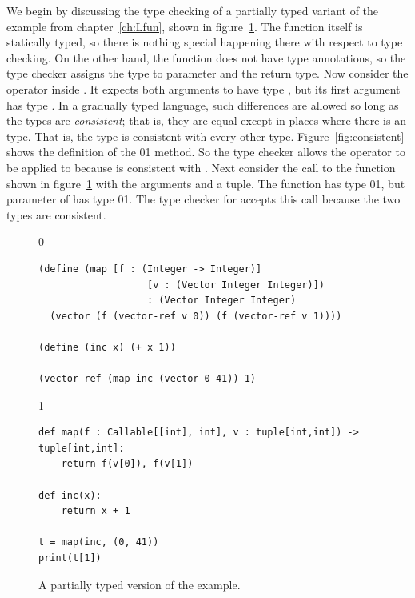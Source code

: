 \documentclass[7x10]{TimesAPriori_MIT}%
\def\racketEd{0}
\def\pythonEd{1}
\def\edition{1}
\newcommand{\racket}[1]{{\if\edition\racketEd{#1}\fi}}
\newcommand{\pythonColor}[0]{}
\newcommand{\python}[1]{{\if\edition\pythonEd\pythonColor #1\fi}}
\numberwithin{theorem}{chapter}
\numberwithin{definition}{chapter}
\numberwithin{equation}{chapter}
\begin{document}
We begin by discussing the type checking of a partially typed variant
of the  example from chapter~\ref{ch:Lfun}, shown in
figure~\ref{fig:gradual-map}.  The  function itself is
statically typed, so there is nothing special happening there with
respect to type checking. On the other hand, the  function
does not have type annotations, so the type checker assigns the type
\CANYTY{} to parameter  and the return type.  Now consider the
\code{+} operator inside . It expects both arguments to have
type \INTTY{}, but its first argument  has type \CANYTY{}.  In
a gradually typed language, such differences are allowed so long as
the types are \emph{consistent}; that is, they are equal except in
places where there is an \CANYTY{} type. That is, the type \CANYTY{}
is consistent with every other type.  Figure~\ref{fig:consistent}
shows the definition of the
\racket{}\python{} method.
%
So the type checker allows the \code{+} operator to be applied
to  because \CANYTY{} is consistent with \INTTY{}.
%
Next consider the call to the  function shown in
figure~\ref{fig:gradual-map} with the arguments  and a
tuple. The  function has type
\racket{}\python{},
but parameter  of  has type
\racket{}\python{}.
The type checker for \LangGrad{} accepts this call because the two types are
consistent.

\begin{figure}[btp]
  \begin{tcolorbox}[colback=white]
{\if\edition\racketEd
    \begin{lstlisting}
(define (map [f : (Integer -> Integer)]
                   [v : (Vector Integer Integer)])
                   : (Vector Integer Integer)
  (vector (f (vector-ref v 0)) (f (vector-ref v 1))))

(define (inc x) (+ x 1))

(vector-ref (map inc (vector 0 41)) 1)
    \end{lstlisting}
    \fi}
{\if\edition\pythonEd\pythonColor
\begin{lstlisting}
def map(f : Callable[[int], int], v : tuple[int,int]) -> tuple[int,int]:
    return f(v[0]), f(v[1])

def inc(x):
    return x + 1

t = map(inc, (0, 41))
print(t[1])
\end{lstlisting}
  \fi}
  \end{tcolorbox}

  \caption{A partially typed version of the  example.}
\label{fig:gradual-map}
\end{figure}
\end{document}
